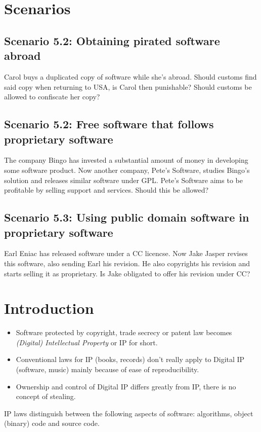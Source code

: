 \documentclass[a4paper]{article}
\begin{document}
\section*{Scenarios}
\subsection*{Scenario 5.2: Obtaining pirated software abroad}
Carol buys a duplicated copy of software while she's abroad.
Should customs find said copy when returning to USA,
is Carol then punishable? Should customs be allowed to confiscate her copy?

\subsection*{Scenario 5.2: Free software that follows proprietary software}
The company Bingo has invested a substantial amount of money in developing
some software product. Now another company, Pete's Software,
studies Bingo's solution and releases similar software under GPL.
Pete's Software aims to be profitable by selling support and services.
Should this be allowed?

\subsection*{Scenario 5.3: Using public domain software in proprietary software}
Earl Eniac has released software under a CC licencse.
Now Jake Jasper revises this software, also sending Earl his revision.
He also copyrights his revision and starts selling it as proprietary.
Is Jake obligated to offer his revision under CC?

\section*{Introduction}
\begin{itemize}
\item Software protected by copyright, trade secrecy or patent law becomes
      \textit{(Digital) Intellectual Property} or IP for short.
\item Conventional laws for IP (books, records) don't really apply to
      Digital IP (software, music) mainly because of ease of reproducibility.
\item Ownership and control of Digital IP differs greatly from IP,
      there is no concept of stealing.
\end{itemize}

IP laws distinguish between the following aspects of software:
algorithms, object (binary) code and source code.
\end{document}
